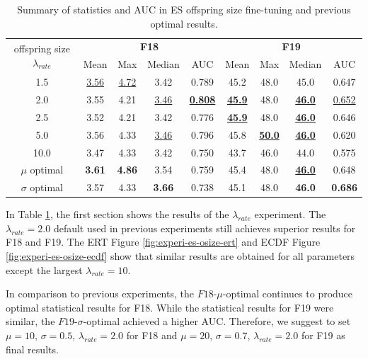 \documentclass{article}
\begin{document}
\begin{table}[!ht]
    \centering
    \caption{Summary of statistics and AUC in ES offspring size fine-tuning and previous optimal results.}
    \label{tab:experi-es-osize}
    \begin{tabular}{ccccccccc}
        \toprule
        \multirow{2}[3]{*}{offspring size $\lambda_{rate}$} &
        \multicolumn{4}{c}{\textbf{F18}} &
        \multicolumn{4}{c}{\textbf{F19}}\\
        \cmidrule(lr){2-5}
        \cmidrule(lr){6-9}
        & Mean & Max & Median & AUC & Mean & Max & Median & AUC\\
        \midrule
        1.5   & \underline{3.56} & \underline{4.72} & 3.42 & 0.789& 45.2& 48.0& 45.0& 0.647\\
        2.0   & 3.55 & 4.21 & \underline{3.46} &\underline{\textbf{ 0.808}}& \underline{\textbf{45.9}}& 48.0 & \underline{\textbf{46.0}} & \underline{0.652}\\
        2.5   & 3.52 & 4.21 & 3.42 & 0.776& \underline{\textbf{45.9}}& 48.0 & \underline{\textbf{46.0}} & 0.646\\
        5.0   & 3.56 & 4.33 & \underline{3.46} & 0.796& 45.8& \underline{\textbf{50.0}}& \underline{\textbf{46.0}} & 0.620\\
        10.0  & 3.47 & 4.33 & 3.42 & 0.750& 43.7& 46.0& 44.0 & 0.575\\
        \midrule
        $\mu$ optimal  & \textbf{3.61} & \textbf{4.86} & 3.54 & 0.759 & 45.4  & 48.0 & \underline{\textbf{46.0}} & 0.648\\
        $\sigma$ optimal & 3.57 & 4.33 & \textbf{3.66} & 0.738 & 45.1 & 48.0 & \textbf{46.0} & \textbf{0.686}\\
        \bottomrule
    \end{tabular}
\end{table}

In Table \ref{tab:experi-es-osize}, the first section shows the results of the $\lambda_{rate}$ experiment. The $\lambda_{rate}=2.0$ default used in previous experiments still achieves superior results for F18 and F19. The ERT Figure \ref{fig:experi-es-osize-ert} and ECDF Figure \ref{fig:experi-es-osize-ecdf} show that similar results are obtained for all parameters except the largest $\lambda_{rate}=10$.

In comparison to previous experiments, the $F18$-$\mu$-optimal continues to produce optimal statistical results for F18. While the statistical results for F19 were similar, the $F19$-$\sigma$-optimal achieved a higher AUC. Therefore, we suggest to set $\mu = 10$, $\sigma = 0.5$, $\lambda_{rate} = 2.0$ for  F18 and $\mu = 20$, $\sigma = 0.7$, $\lambda_{rate} = 2.0$ for  F19 as final results. 
\end{document}
